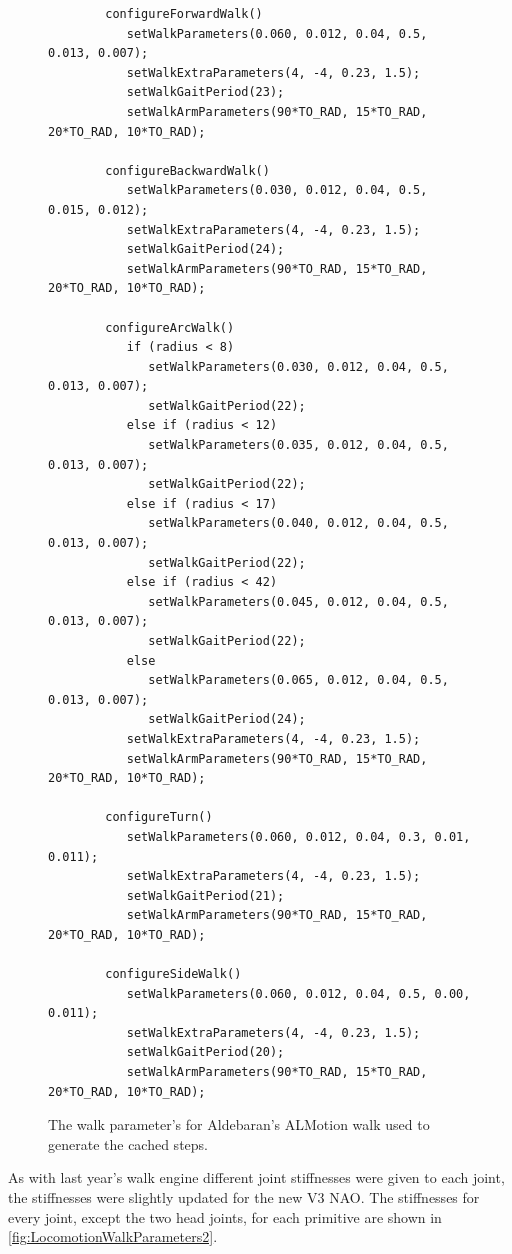 \begin{figure}
	\begin{center}
		{\scriptsize\begin{verbatim}
		configureForwardWalk()
		   setWalkParameters(0.060, 0.012, 0.04, 0.5, 0.013, 0.007);
		   setWalkExtraParameters(4, -4, 0.23, 1.5);
		   setWalkGaitPeriod(23);
		   setWalkArmParameters(90*TO_RAD, 15*TO_RAD, 20*TO_RAD, 10*TO_RAD);

		configureBackwardWalk()
		   setWalkParameters(0.030, 0.012, 0.04, 0.5, 0.015, 0.012);
		   setWalkExtraParameters(4, -4, 0.23, 1.5);
		   setWalkGaitPeriod(24);
		   setWalkArmParameters(90*TO_RAD, 15*TO_RAD, 20*TO_RAD, 10*TO_RAD);

		configureArcWalk()
		   if (radius < 8)
		      setWalkParameters(0.030, 0.012, 0.04, 0.5, 0.013, 0.007);
		      setWalkGaitPeriod(22);
		   else if (radius < 12)
		      setWalkParameters(0.035, 0.012, 0.04, 0.5, 0.013, 0.007);
		      setWalkGaitPeriod(22);
		   else if (radius < 17)
		      setWalkParameters(0.040, 0.012, 0.04, 0.5, 0.013, 0.007);
		      setWalkGaitPeriod(22);
		   else if (radius < 42)
		      setWalkParameters(0.045, 0.012, 0.04, 0.5, 0.013, 0.007);
		      setWalkGaitPeriod(22);
		   else
		      setWalkParameters(0.065, 0.012, 0.04, 0.5, 0.013, 0.007);
		      setWalkGaitPeriod(24);
		   setWalkExtraParameters(4, -4, 0.23, 1.5);
		   setWalkArmParameters(90*TO_RAD, 15*TO_RAD, 20*TO_RAD, 10*TO_RAD);

		configureTurn()
		   setWalkParameters(0.060, 0.012, 0.04, 0.3, 0.01, 0.011);
		   setWalkExtraParameters(4, -4, 0.23, 1.5);
		   setWalkGaitPeriod(21);
		   setWalkArmParameters(90*TO_RAD, 15*TO_RAD, 20*TO_RAD, 10*TO_RAD);

		configureSideWalk()
		   setWalkParameters(0.060, 0.012, 0.04, 0.5, 0.00, 0.011);
		   setWalkExtraParameters(4, -4, 0.23, 1.5);
		   setWalkGaitPeriod(20);
		   setWalkArmParameters(90*TO_RAD, 15*TO_RAD, 20*TO_RAD, 10*TO_RAD);
		\end{verbatim}}
		\caption{The walk parameter's for Aldebaran's ALMotion walk used to generate the cached steps.}
		\label{fig:LocomotionWalkParameters}
	\end{center}
\end{figure}

As with last year's walk engine \cite{JasonsAcraPaper} different joint stiffnesses were given to each joint, the stiffnesses were slightly updated for the new V3 NAO. The stiffnesses for every joint, except the two head joints, for each primitive are shown in \autoref{fig:LocomotionWalkParameters2}.

